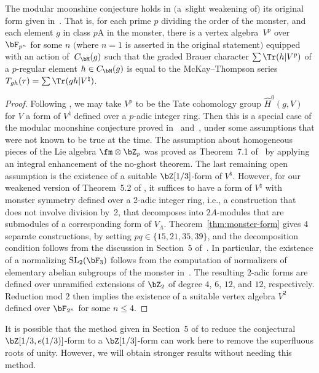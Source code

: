 \begin{cor}\label{cor:weak-modular-moonshine}
The modular moonshine conjecture holds in \linebreak $($a~slight weakening of$)$ its original form given in~{\rm \cite{R96}}. That is, for each prime $p$ dividing the order of the monster, and each element $g$ in class $p$A in the monster, there is a vertex algebra~$V^p$ over $\bF_{p^n}$ for some $n$ $($where $n=1$ is asserted in the original statement$)$ equipped with an action of~$C_\bM(g)$ such that the graded Brauer character $\sum \Tr(h|V^p)$ of a $p$-regular element $h \in C_\bM(g)$ is equal to the McKay--Thompson series $T_{gh}(\tau) = \sum \Tr(gh|V^\natural)$.
\end{cor}
\begin{proof}Following \cite{BR96}, we may take $V^p$ to be the Tate cohomology group $\hat{H}^0(g,V)$ for $V$ a form of $V^\natural$ defined over a $p$-adic integer ring. Then this is a special case of the modular moonshine conjecture proved in~\cite{BR96} and~\cite{B98}, under some assumptions that were not known to be true at the time. The assumption about homogeneous pieces of the Lie algebra $\fm \otimes \bZ_p$ was proved as Theorem~7.1 of~\cite{B99} by applying an integral enhancement of the no-ghost theorem. The last remaining open assumption is the existence of a suitable $\bZ[1/3]$-form of $V^\natural$. However, for our weakened version of Theorem~5.2 of \cite{BR96}, it suffices to have a form of $V^\natural$ with monster symmetry defined over a 2-adic integer ring, i.e., a construction that does not involve division by~2, that decomposes into $2A$-modules that are submodules of a corresponding form of $V_\Lambda$. Theorem~\ref{thm:monster-form} gives 4 separate constructions, by setting $pq \in \{ 15, 21, 35, 39 \}$, and the decomposition condition follows from the discussion in Section~5 of~\cite{BR96}. In particular, the existence of a normalizing ${\rm SL}_2(\bF_3)$ follows from the computation of normalizers of elementary abelian subgroups of the monster in~\cite{W88}. The resulting 2-adic forms are defined over unramified extensions of $\bZ_2$ of degree $4$, $6$, $12$, and $12$, respectively. Reduction mod $2$ then implies the existence of a suitable vertex algebra $V^2$ defined over $\bF_{2^n}$ for some $n \leq 4$.
\end{proof}

\begin{rem}It is possible that the method given in Section~5 of \cite{BR96} to reduce the conjectural $\bZ[1/3,e(1/3)]$-form to a $\bZ[1/3]$-form can work here to remove the superfluous roots of unity. However, we will obtain stronger results without needing this method.
\end{rem}

